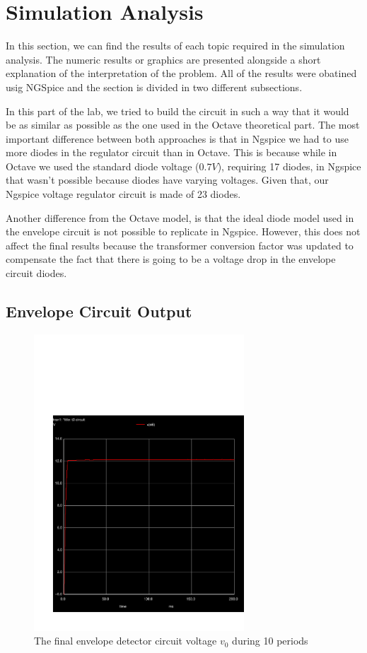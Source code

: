 \section{Simulation Analysis}
\label{sec:simulation}

In this section, we can find the results of each topic required in the simulation analysis. The numeric results or graphics are presented alongside a short explanation of the interpretation of the problem. All of the results were obatined usig NGSpice and the section is divided in two different subsections. 

In this part of the lab, we tried to build the circuit in such a way that it would be as similar as possible as the one used in the Octave theoretical part. The most important difference between both approaches is that in Ngspice we had to use more diodes in the regulator circuit than in Octave. This is because while in Octave we used the standard diode voltage ($0.7 V$), requiring 17 diodes, in Ngspice that wasn't possible because diodes have varying voltages. Given that, our Ngspice voltage regulator circuit is made of 23 diodes.

Another difference from the Octave model, is that the ideal diode model used in the envelope circuit is not possible to replicate in Ngspice. However, this does not affect the final results because the transformer conversion factor was updated to compensate the fact that there is going to be a voltage drop in the envelope circuit diodes.

\subsection{Envelope Circuit Output}

\begin{figure}[H] \centering
\includegraphics[trim= 0cm 0cm 0cm 10cm, clip, width=0.7\textwidth]{trans1.pdf}
\caption{The final envelope detector circuit voltage $v_0$ during 10 periods}
\label{fig:sim_envelope}
\end{figure}


